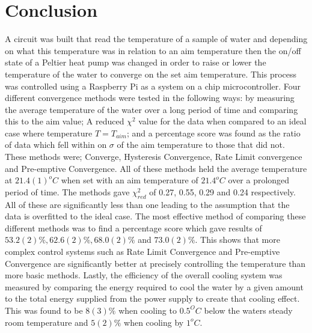 \documentclass[10pt]{article}
\begin{document}
\section*{Conclusion}
A circuit was built that read the temperature of a sample of water and depending on what this temperature was in relation to an aim temperature then the on/off state of a Peltier heat pump was changed in order to raise or lower the temperature of the water to converge on the set aim temperature. This process was controlled using a Raspberry Pi as a system on a chip microcontroller. Four different convergence methods were tested in the following ways: by measuring the average temperature of the water over a long period of time and comparing this to the aim value; A reduced $\chi^2$ value for the data when compared to an ideal case where temperature $T=T_{aim}$; and a percentage score was found as the ratio of data which fell within on $\sigma$ of the aim temperature to those that did not. These methods were; Converge, Hysteresis Convergence, Rate Limit convergence and Pre-emptive Convergence. All of these methods held the average temperature at $21.4(1)^oC$ when set with an aim temperature of $21.4^oC$ over a prolonged period of time. The methods gave $\chi^2_{red}$ of 0.27, 0.55, 0.29 and 0.24 respectively. All of these are significantly less than one leading to the assumption that the data is overfitted to the ideal case. The most effective method of comparing these different methods was to find a percentage score which gave results of $53.2(2)\%, 62.6(2)\%, 68.0(2)\%$ and $73.0(2)\%$. This shows that more complex control systems such as Rate Limit Convergence and Pre-emptive Convergence are significantly better at precisely controlling the temperature than more basic methods. Lastly, the efficiency of the overall cooling system was measured by comparing the energy required to cool the water by a given amount to the total energy supplied from the power supply to create that cooling effect. This was found to be $8(3)\%$ when cooling to $0.5^OC$ below the waters steady room temperature and $5(2)\%$ when cooling by $1^oC$. 






\newpage
\appendix
\end{document}
